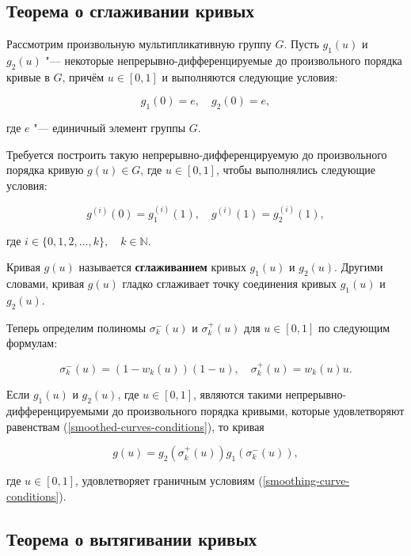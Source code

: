 \subsection*{Теорема о сглаживании кривых}

Рассмотрим произвольную мультипликативную группу $G$. Пусть $g_1(u)$ и $g_2(u)$ "--- некоторые
непрерывно-дифференцируемые до произвольного порядка кривые в $G$, причём $u \in [0,1]$ и выполняются следующие условия:

\begin{equation}
g_1(0)=e, \quad g_2(0)=e,
\label{smoothed-curves-conditions}
\end{equation}

\noindent где $e$ "--- единичный элемент группы $G$.

Требуется построить такую непрерывно-дифференцируемую до произвольного порядка кривую $g(u)\in G$, где $u \in [0,1]$,
чтобы выполнялись следующие условия:

\begin{equation}
g^{(i)}(0)=g_1^{(i)}(1), \quad g^{(i)}(1)=g_2^{(i)}(1),
\label{smoothing-curve-conditions}
\end{equation}

\noindent где $i \in \{0,1,2,\dots,k\},\quad k\in\mathbb{N}$.

\begin{definition}
Кривая $g(u)$ называется \textbf{сглаживанием} кривых $g_1(u)$ и $g_2(u)$. Другими словами, кривая $g(u)$ гладко
сглаживает точку соединения кривых $g_1(u)$ и $g_2(u)$.
\end{definition}

Теперь определим полиномы $\sigma_k^-(u)$ и $\sigma_k^+(u)$ для $u \in [0,1]$ по следующим формулам:

$$
\sigma_k^-(u)=(1-w_k(u))(1-u), \quad \sigma_k^+(u)=w_k(u)u.
$$

\begin{theorem}
Если $g_1(u)$ и $g_2(u)$, где $u \in [0,1]$, являются такими непрерывно-дифференцируемыми до произвольного порядка
кривыми, которые удовлетворяют равенствам (\ref{smoothed-curves-conditions}), то кривая

$$
g(u)=g_2(\sigma_k^+(u))g_1(\sigma_k^-(u)),
$$

\noindent где $u \in [0,1]$, удовлетворяет граничным условиям (\ref{smoothing-curve-conditions}).
\end{theorem}

\subsection*{Теорема о вытягивании кривых}

